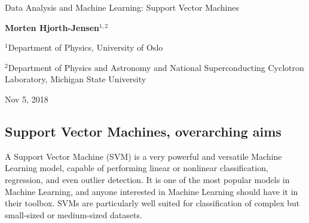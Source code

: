 \documentclass[%
oneside,                 %
final,                   %
10pt]{article}
\begin{document}

\newcommand{\exercisesection}[1]{\subsection*{#1}}






\thispagestyle{empty}

\begin{center}
{\LARGE\bf
\begin{spacing}{1.25}
Data Analysis and Machine Learning: Support Vector Machines
\end{spacing}
}
\end{center}


\begin{center}
{\bf Morten Hjorth-Jensen${}^{1, 2}$} \\ [0mm]
\end{center}

\begin{center}
\centerline{{\small ${}^1$Department of Physics, University of Oslo}}
\centerline{{\small ${}^2$Department of Physics and Astronomy and National Superconducting Cyclotron Laboratory, Michigan State University}}
\end{center}
    

\begin{center}
Nov 5, 2018
\end{center}

\vspace{1cm}


\subsection{Support Vector Machines, overarching aims}

A Support Vector Machine (SVM) is a very powerful and versatile
Machine Learning model, capable of performing linear or nonlinear
classification, regression, and even outlier detection. It is one of
the most popular models in Machine Learning, and anyone interested in
Machine Learning should have it in their toolbox. SVMs are
particularly well suited for classification of complex but small-sized or
medium-sized datasets.  
\end{document}
